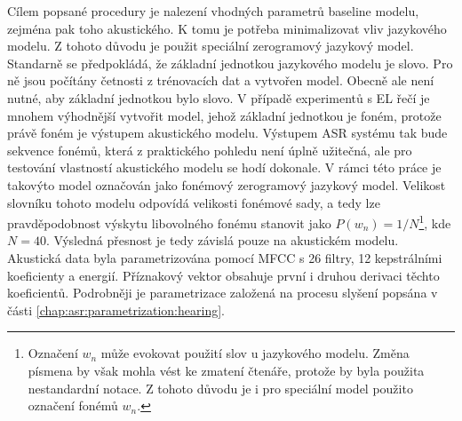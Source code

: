 Cílem popsané procedury je nalezení vhodných parametrů baseline modelu, zejména pak toho akustického.
K tomu je potřeba minimalizovat vliv jazykového modelu.
Z tohoto důvodu je použit speciální zerogramový jazykový model.
Standarně se předpokládá, že základní jednotkou jazykového modelu je slovo.
Pro ně jsou počítány četnosti z trénovacích dat a vytvořen model.
Obecně ale není nutné, aby základní jednotkou bylo slovo. V případě experimentů s EL řečí je mnohem výhodnější vytvořit model, jehož základní jednotkou je foném, protože právě foném je výstupem akustického modelu.
Výstupem ASR systému tak bude sekvence fonémů, která z praktického pohledu není úplně užitečná, ale pro testování vlastností akustického modelu se hodí dokonale.
V rámci této práce je takovýto model označován jako fonémový zerogramový jazykový model.
Velikost slovníku tohoto modelu odpovídá velikosti fonémové sady, a tedy lze pravděpodobnost výskytu libovolného fonému stanovit jako $P(w_n) = 1/N$\footnote{Označení $w_n$ může evokovat použití slov u jazykového modelu. Změna písmena by však mohla vést ke zmatení čtenáře, protože by byla použita nestandardní notace. Z tohoto důvodu je i pro speciální model použito označení fonémů $w_n$.}, kde $N=40$.
Výsledná přesnost je tedy závislá pouze na akustickém modelu.
Akustická data byla parametrizována pomocí MFCC s 26 filtry, 12 kepstrálními koeficienty a energií.
Příznakový vektor obsahuje první i druhou derivaci těchto koeficientů.
Podrobněji je parametrizace založená na procesu slyšení popsána v části \ref{chap:asr:parametrization:hearing}.





